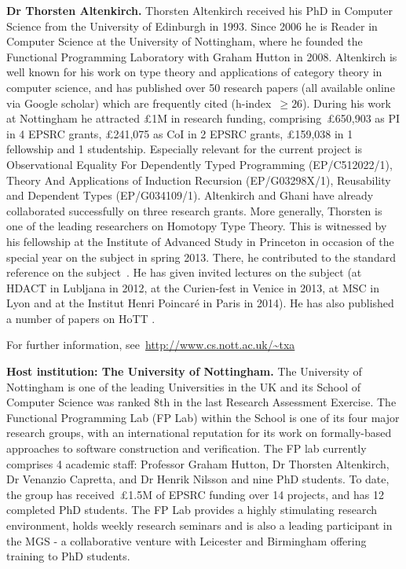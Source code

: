 \documentclass[a4paper,11pt]{article}
\begin{document}
\textbf{Dr Thorsten Altenkirch.}  Thorsten Altenkirch received his PhD in
Computer Science from the University of Edinburgh in 1993. Since 2006
he is Reader in Computer Science at the University of Nottingham,
where he founded the Functional Programming Laboratory with Graham
Hutton in 2008. Altenkirch is well known for his work on type theory
and applications of category theory in computer science, and has
published over 50 research papers (all available online via Google
scholar) which are frequently cited (h-index~$\geq 26$). During his
work at Nottingham he attracted \pounds 1M in research funding,
comprising~\pounds650,903 as PI in 4 EPSRC grants, \pounds241,075 as
CoI in 2 EPSRC grants, \pounds159,038 in 1 fellowship and 1
studentship. Especially relevant for the current project is
Observational Equality For Dependently Typed Programming
(EP/C512022/1), Theory And Applications of Induction Recursion
(EP/G03298X/1), Reusability and Dependent Types
(EP/G034109/1). Altenkirch and Ghani have already collaborated
successfully on three research grants. More generally, 
Thorsten is one of the leading researchers on Homotopy Type Theory.
This is witnessed by his fellowship at the Institute of Advanced Study
in Princeton in occasion of the special year on the subject in spring
2013. There, he contributed to the standard reference on the
subject~\cite{hott-book}.  He has given invited lectures on the
subject (at HDACT in Lubljana in 2012, at the Curien-fest in Venice in
2013, at MSC in Lyon and at the Institut Henri Poincar\'e in Paris in
2014). He has also published a number of papers on HoTT
\cite{altenkirch:extSetoids,alti:ott-conf,alti:csl12,alti:tlca13-hedberg}.

For further information, see~\url{http://www.cs.nott.ac.uk/~txa}

\textbf{Host institution: The University of Nottingham.}  The
University of Nottingham is one of the leading Universities in the UK
and its School of Computer Science was ranked 8th in the last Research
Assessment Exercise. The Functional Programming Lab (FP Lab) within the School
is one of its four major research groups, with an international
reputation for its work on formally-based approaches to software
construction and verification.  The FP lab currently comprises 4
academic staff: Professor Graham Hutton, Dr Thorsten Altenkirch, Dr
Venanzio Capretta, and Dr Henrik Nilsson and nine PhD students.  To
date, the group has received~\pounds1.5M of EPSRC funding over 14
projects, and has 12 completed PhD students.  The FP Lab provides a highly stimulating research environment,
holds weekly research seminars and is also a leading participant in the MGS - a
collaborative venture with Leicester and Birmingham offering training
to PhD students.
\noindent
\end{document}
